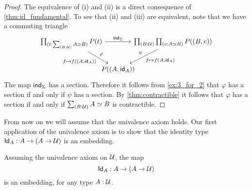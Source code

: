 \begin{proof}
The equivalence of (i) and (ii) is a direct consequence of \cref{thm:id_fundamental}. 
To see that (ii) and (iii) are equivalent, note that we have a commuting triangle
\begin{equation*}
\begin{tikzcd}[column sep=-1em]
\prd{t:\sm{B:\UU}\eqv{A}{B}}P(t) \arrow[rr,"\ind{\Sigma}"] \arrow[dr,"\varphi","{f\mapsto f((A,\idfunc[A]))}"'] & & \prd{B:\UU}{e:\eqv{A}{B}} P((B,e)) \arrow[dl,"{f\mapsto f(A,\idfunc[A])}","\psi"'] \\
& P((A,\idfunc[A]))
\end{tikzcd}
\end{equation*}
The map $\mathsf{ind}_{\Sigma}$ has a section. Therefore it follows from \cref{ex:3_for_2} that $\varphi$ has a section if and only if $\psi$ has a section. By \cref{thm:contractible} it follows that $\varphi$ has a section if and only if $\sm{B:\UU}\eqv{A}{B}$ is contractible. 
\end{proof}

From now on we will assume that the univalence axiom holds. Our first application of the univalence axiom is to show that the identity type $\mathsf{Id}_{A}:A\to (A\to\mathcal{U})$ is an embedding. 

\begin{thm}
Assuming the univalence axiom on $\mathcal{U}$, the map
\begin{equation*}
\mathsf{Id}_{A}:A\to (A\to\mathcal{U})
\end{equation*}
is an embedding, for any type $A:\mathcal{U}$.
\end{thm}

